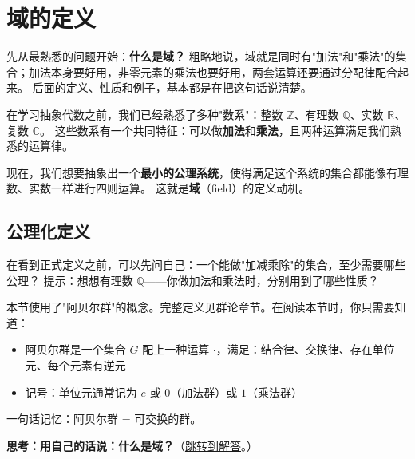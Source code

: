 
\section{域的定义}\label{sec:field-definition}

先从最熟悉的问题开始：\textbf{什么是域？}
粗略地说，域就是同时有"加法"和"乘法"的集合；加法本身要好用，非零元素的乘法也要好用，两套运算还要通过分配律配合起来。
后面的定义、性质和例子，基本都是在把这句话说清楚。

在学习抽象代数之前，我们已经熟悉了多种"数系"：整数 $\mathbb{Z}$、有理数 $\mathbb{Q}$、实数 $\mathbb{R}$、复数 $\mathbb{C}$。
这些数系有一个共同特征：可以做\textbf{加法}和\textbf{乘法}，且两种运算满足我们熟悉的运算律。

现在，我们想要抽象出一个\textbf{最小的公理系统}，使得满足这个系统的集合都能像有理数、实数一样进行四则运算。
这就是\textbf{域}（field）的定义动机。

\subsection{公理化定义}

在看到正式定义之前，可以先问自己：一个能做"加减乘除"的集合，至少需要哪些公理？
提示：想想有理数 $\mathbb{Q}$——你做加法和乘法时，分别用到了哪些性质？

本节使用了"阿贝尔群"的概念。完整定义见群论章节。在阅读本节时，你只需要知道：
\begin{itemize}
    \item 阿贝尔群是一个集合 $G$ 配上一种运算 $\cdot$，满足：结合律、交换律、存在单位元、每个元素有逆元
    \item 记号：单位元通常记为 $e$ 或 $0$（加法群）或 $1$（乘法群）
\end{itemize}
一句话记忆：阿贝尔群 = 可交换的群。

\hypertarget{q:field-what-is-field}{}
\medskip
\noindent\textbf{思考：用自己的话说：什么是域？}（\hyperlink{ans:field-what-is-field}{跳转到解答}。）
\medskip

